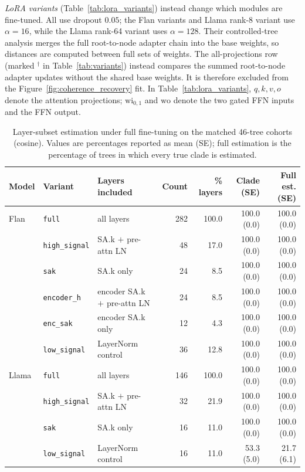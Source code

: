 \documentclass{article}
\theoremstyle{definition}
\theoremstyle{plain}
\begin{document}
\emph{LoRA variants} (Table~\ref{tab:lora_variants}) instead change which modules are fine-tuned.
All use dropout $0.05$; the Flan variants and Llama rank-8 variant use $\alpha=16$, while the Llama
rank-64 variant uses $\alpha=128$. Their controlled-tree analysis merges the full
root-to-node adapter chain into the base weights, so distances are computed between full sets of weights. The
all-projections row (marked $^\dagger$ in Table~\ref{tab:variants}) instead compares the summed root-to-node adapter updates without the shared base weights. It is therefore excluded from the Figure~\ref{fig:coherence_recovery} fit.
In Table~\ref{tab:lora_variants}, $q,k,v,o$ denote the attention projections; $\mathrm{wi}_{0,1}$
and $\mathrm{wo}$ denote the two gated FFN inputs and the FFN output.

\begin{table}[h]
\caption{Layer-subset estimation under full fine-tuning on the matched 46-tree cohorts (cosine). Values are
percentages reported as mean (SE); full estimation is the percentage of trees in which every true clade is estimated.}
\label{tab:layer_subsets}
\centering
\scriptsize
\setlength{\tabcolsep}{2pt}
\begin{tabular}{lllrrrr}
\toprule
Model & Variant & Layers included & Count & \% layers & Clade (SE) & Full est. (SE) \\
\midrule
Flan & \texttt{full}         & all layers                                  & 282 & 100.0 & 100.0 (0.0) & 100.0 (0.0) \\
     & \texttt{high\_signal} & SA.k $+$ pre-attn LN                        & 48  & 17.0  & 100.0 (0.0) & 100.0 (0.0) \\
     & \texttt{sak}          & SA.k only                                    & 24  & 8.5   & 100.0 (0.0) & 100.0 (0.0) \\
     & \texttt{encoder\_h}   & encoder SA.k $+$ pre-attn LN                 & 24  & 8.5   & 100.0 (0.0) & 100.0 (0.0) \\
     & \texttt{enc\_sak}     & encoder SA.k only                            & 12  & 4.3   & 100.0 (0.0) & 100.0 (0.0) \\
     & \texttt{low\_signal}  & LayerNorm control                            & 36  & 12.8  & 100.0 (0.0) & 100.0 (0.0) \\
\midrule
Llama & \texttt{full}         & all layers                                  & 146 & 100.0 & 100.0 (0.0) & 100.0 (0.0) \\
      & \texttt{high\_signal} & SA.k $+$ pre-attn LN                        & 32  & 21.9  & 100.0 (0.0) & 100.0 (0.0) \\
      & \texttt{sak}          & SA.k only                                    & 16  & 11.0  & 100.0 (0.0) & 100.0 (0.0) \\
      & \texttt{low\_signal}  & LayerNorm control                            & 16  & 11.0  & 53.3 (5.0)  & 21.7 (6.1) \\
\bottomrule
\end{tabular}
\end{table}
\end{document}
